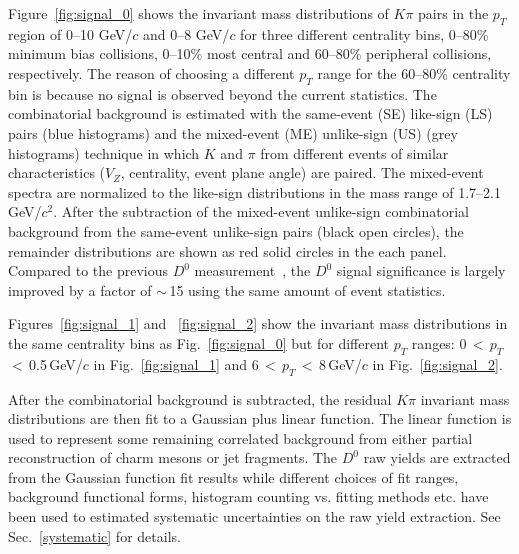 \documentclass[%
 reprint,	
 amsmath,amssymb,
 aps,
 prc,
]{revtex4-1}
\begin{document}
Figure~\ref{fig:signal_0} shows the invariant mass distributions of $K\pi$ pairs in the $p_{T}$ region of 0--10 GeV/$c$ and 0--8 GeV/$c$ for three different centrality bins, 0--80\% minimum bias collisions, 0--10\% most central and 60--80\% peripheral collisions, respectively. The reason of choosing a different $p_T$ range for the 60--80\% centrality bin is because no signal is observed beyond the current statistics. The combinatorial background is estimated with the same-event (SE) like-sign (LS) pairs (blue histograms) and the mixed-event (ME) unlike-sign (US) (grey histograms) technique in which $K$ and $\pi$ from different events of similar characteristics ($V_{Z}$, centrality, event plane angle) are paired. The mixed-event spectra are normalized to the like-sign distributions in the mass range of 1.7--2.1\,GeV/$c^2$. After the subtraction of the mixed-event unlike-sign combinatorial background from the same-event unlike-sign pairs (black open circles), the remainder distributions are shown as red solid circles in the each panel. Compared to the previous $D^0$ measurement~\cite{Star_D_RAA}, the $D^0$ signal significance is largely improved by a factor of $\sim$\,15 using the same amount of event statistics. %

Figures~\ref{fig:signal_1} and ~\ref{fig:signal_2} show the invariant mass distributions in the same centrality bins as Fig.~\ref{fig:signal_0} but for different $p_T$ ranges: 0\,$<$\,$p_{T}$\,$<$\,0.5\,GeV/$c$ in Fig.~\ref{fig:signal_1} and 6\,$<$\,$p_{T}$\,$<$\,8\,GeV/$c$ in Fig.~\ref{fig:signal_2}.

After the combinatorial background is subtracted, the residual $K\pi$ invariant mass distributions are then fit to a Gaussian plus linear function. The linear function is used to represent some remaining correlated background from either partial reconstruction of charm mesons or jet fragments.
The $D^0$ raw yields are extracted from the Gaussian function fit results while different choices of fit ranges, background functional forms, histogram counting vs. fitting methods etc. have been used to estimated systematic uncertainties on the raw yield extraction. See Sec.~\ref{systematic} for details.
\end{document}

